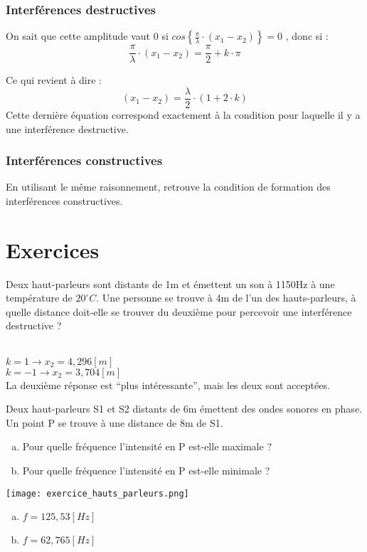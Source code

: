 \subsubsection{Interférences destructives}
On sait que cette amplitude vaut \(0\) si \(cos \left \lbrace \frac{\pi}{\lambda}\cdot (x_1-x_2) \right \rbrace = 0\) , donc si :
\begin{equation}
    \frac{\pi}{\lambda}\cdot (x_1-x_2) = \frac{\pi}{2}+k \cdot \pi
\end{equation}

Ce qui revient à dire :
\begin{equation}
    (x_1-x_2) = \frac{\lambda}{2} \cdot (1+2\cdot k )
\end{equation}
Cette dernière équation correspond exactement à la condition pour laquelle il y a une interférence destructive.

\subsubsection{Interférences constructives}
En utilisant le même raisonnement, retrouve la condition de formation des interférences constructives.

\newpage

\section{Exercices}
\begin{exercise}
    Deux haut-parleurs sont distants de 1m et émettent un son à 1150Hz à une température de \(20^\circ C\). Une personne se trouve à 4m de l'un des hauts-parleurs, à quelle distance doit-elle se trouver du deuxième pour percevoir une interférence destructive ?
\end{exercise}
\begin{solution}\\
    \(k=1 \rightarrow x_2=4,296[m]\)\\
    \(k=-1 \rightarrow x_2=3,704[m]\)\\
    La deuxième réponse est \enquote{plus intéressante}, mais les deux sont acceptées.
\end{solution}

\begin{exercise}
    Deux haut-parleurs S1 et S2 distants de 6m émettent des ondes sonores en phase. Un point P se trouve à une distance de 8m de S1.
    \begin{enumerate}[a)]
        \item Pour quelle fréquence l'intensité en P est-elle maximale ?
        \item Pour quelle fréquence l'intensité en P est-elle minimale ?
    \end{enumerate}
    \texttt{[image: exercice\_hauts\_parleurs.png]}
\end{exercise}
\begin{solution}
    \begin{enumerate}[a)]
        \item \(f=125,53[Hz]\)
        \item \(f=62,765[Hz]\)
    \end{enumerate}
\end{solution}

